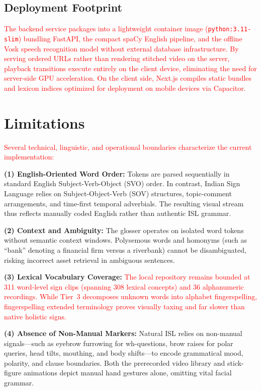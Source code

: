 \documentclass[conference,a4paper,10pt]{IEEEtran}
\begin{document}
\subsection{Deployment Footprint}

\textcolor{red}{The backend service packages into a lightweight container image (\texttt{python:3.11-slim}) bundling FastAPI, the compact spaCy English pipeline, and the offline Vosk speech recognition model without external database infrastructure. By serving ordered URLs rather than rendering stitched video on the server, playback transitions execute entirely on the client device, eliminating the need for server-side GPU acceleration. On the client side, Next.js compiles static bundles and lexicon indices optimized for deployment on mobile devices via Capacitor.}

\section{Limitations}
\label{sec:limits}

\textcolor{red}{Several technical, linguistic, and operational boundaries characterize the current implementation:}

\textbf{(1) English-Oriented Word Order:} Tokens are parsed sequentially in standard English Subject-Verb-Object (SVO) order. In contrast, Indian Sign Language relies on Subject-Object-Verb (SOV) structures, topic-comment arrangements, and time-first temporal adverbials. The resulting visual stream thus reflects manually coded English rather than authentic ISL grammar.

\textbf{(2) Context and Ambiguity:} The glosser operates on isolated word tokens without semantic context windows. Polysemous words and homonyms (such as ``bank'' denoting a financial firm versus a riverbank) cannot be disambiguated, risking incorrect asset retrieval in ambiguous sentences.

\textbf{(3) Lexical Vocabulary Coverage:} \textcolor{red}{The local repository remains bounded at 311 word-level sign clips (spanning 308 lexical concepts) and 36 alphanumeric recordings. While Tier~3 decomposes unknown words into alphabet fingerspelling, fingerspelling extended terminology proves visually taxing and far slower than native holistic signs.}

\textbf{(4) Absence of Non-Manual Markers:} Natural ISL relies on non-manual signals---such as eyebrow furrowing for wh-questions, brow raises for polar queries, head tilts, mouthing, and body shifts---to encode grammatical mood, polarity, and clause boundaries. Both the prerecorded video library and stick-figure animations depict manual hand gestures alone, omitting vital facial grammar.
\end{document}

